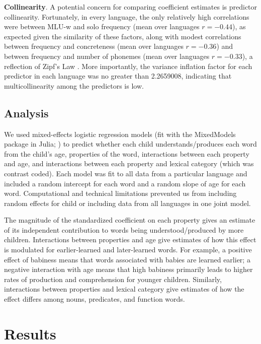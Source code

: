 \documentclass[
   11pt,
       ]{book}
\begin{document}
\textbf{Collinearity}. A potential concern for comparing coefficient estimates is predictor collinearity. Fortunately, in every language, the only relatively high correlations were between MLU-w and solo frequency (mean over languages \(r = -0.44\)), as expected given the similarity of these factors, along with modest correlations between frequency and concreteness (mean over languages \(r = -0.36\)) and between frequency and number of phonemes (mean over languages \(r = -0.33\)), a reflection of Zipf's Law \citep{zipf1935}. More importantly, the variance inflation factor for each predictor in each language was no greater than 2.2659008, indicating that multicollinearity among the predictors is low.

\hypertarget{analysis}{%
\subsection{Analysis}\label{analysis}}

We used mixed-effects logistic regression models (fit with the MixedModels package in Julia; \citealp{bates2018}) to predict whether each child understands/produces each word from the child's age, properties of the word, interactions between each property and age, and interactions between each property and lexical category (which was contrast coded). Each model was fit to all data from a particular language and included a random intercept for each word and a random slope of age for each word. Computational and technical limitations prevented us from including random effects for child or including data from all languages in one joint model.

The magnitude of the standardized coefficient on each property gives an estimate of its independent contribution to words being understood/produced by more children. Interactions between properties and age give estimates of how this effect is modulated for earlier-learned and later-learned words. For example, a positive effect of babiness means that words associated with babies are learned earlier; a negative interaction with age means that high babiness primarily leads to higher rates of production and comprehension for younger children. Similarly, interactions between properties and lexical category give estimates of how the effect differs among nouns, predicates, and function words.

\hypertarget{results}{%
\section{Results}\label{results}}
\end{document}
